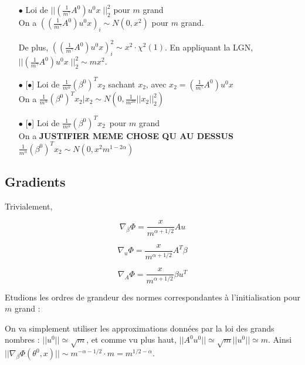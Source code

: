 \documentclass[a4paper, 11pt, french]{article}
\theoremstyle{definition}
\begin{document}
\begin{itemize}
		\item[$\bullet$] Loi de $ || \left(\frac{1}{m^{\gamma}} A^0 \right) u^0 x \; ||_2^2 $ pour $m$ grand
		 \\
		 
		 On a $ \left( \left(\frac{1}{m^{\gamma}} A^0 \right) u^0 x \right)_i \sim  N(0,x^2)$ pour $m$ grand.
		
		De plus, $ \left( \left(\frac{1}{m^{\gamma}} A^0 \right) u^0 x \right)_i^2 \sim  
		x^2 \cdot  \chi^2 (1) $. En appliquant la LGN, $||\left(\frac{1}{m^{\gamma}} A^0 \right) u^0 x \; ||_2^2 \sim m x^2$. \\

		\item[$\bullet$][$\bullet$] Loi de $ \frac{1}{m^{\alpha}} (\beta^0)^T x_2 $ sachant $x_2$, avec 
		$x_2 = \left(\frac{1}{m^{\gamma}} A^0 \right) u^0 x$ \\
		
		On a 
		$ \frac{1}{m^{\alpha}} (\beta^0)^T x_2 | x_2 \sim N(0,  \frac{1}{m^{2\alpha}}||x_2||_2^2) $
		\\
		
		\item[$\bullet$][$\bullet$] Loi de $ \frac{1}{m^{\alpha}} (\beta^0)^T x_2 $ pour $m$ grand\\
		
		On a {\bf JUSTIFIER MEME CHOSE QU AU DESSUS}
		$ \frac{1}{m^{\alpha}} (\beta^0)^T x_2 \sim N(0,  x^2 m^{1 - 2\alpha}) $
		\\
		
	\end{itemize}

	\subsection{Gradients}
	
	Trivialement,
	
	\[\nabla_{\beta} \Phi = \frac{x}{m^{\alpha + 1/2}} A u\]
	
	\[\nabla_u \Phi = \frac{x}{m^{\alpha + 1/2}} A^T \beta\]

	\[\nabla_A \Phi = \frac{x}{m^{\alpha + 1/2}} \beta u^T\]
	
	Etudions les ordres de grandeur des normes correspondantes à l'initialisation pour $m$ grand :
	
	On va simplement utiliser les approximations données par la loi des grands nombres :
	 $||u^0|| \simeq \sqrt{m}$, et comme vu plus haut, 
	 $||A^0 u^0|| \simeq \sqrt{m}||u^0|| \simeq m$. Ainsi $||\nabla_{\beta} \Phi (\theta^0, x)|| \sim m^{-\alpha - 1/2} \cdot m = m^{1/2 - \alpha}$.
	 
\end{document}
